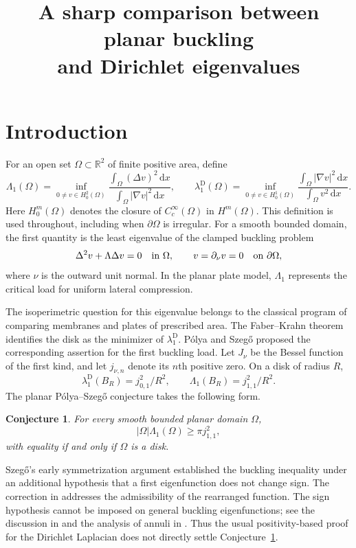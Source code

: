 \documentclass[11pt]{article}
\title{A sharp comparison between planar buckling\\and Dirichlet eigenvalues}
\author{}
\date{}
\newtheorem{conjecture}[theorem]{Conjecture}
\theoremstyle{remark}
\newcommand{\dd}{\,\mathrm d}
\begin{document}
\maketitle

\section{Introduction}
For an open set $\Omega\subset\mathbb R^2$ of finite positive area, define
\[
 \Lambda_1(\Omega)=\inf_{0\ne v\in H_0^2(\Omega)}
       \frac{\int_\Omega(\Delta v)^2\dd x}
            {\int_\Omega|\nabla v|^2\dd x},\qquad
 \lambda_1^{\mathrm D}(\Omega)=\inf_{0\ne v\in H_0^1(\Omega)}
       \frac{\int_\Omega|\nabla v|^2\dd x}
            {\int_\Omega v^2\dd x}.
\]
Here $H_0^m(\Omega)$ denotes the closure of $C_c^\infty(\Omega)$
in $H^m(\Omega)$. This definition is used throughout, including when
$\partial\Omega$ is irregular. For a smooth bounded domain, the first
quantity is the least eigenvalue of the clamped buckling problem
\[
 \Delta^2v+\Lambda\Delta v=0\quad\hbox{in }\Omega,
 \qquad v=\partial_\nu v=0\quad\hbox{on }\partial\Omega,
\]
where $\nu$ is the outward unit normal. In the planar plate model,
$\Lambda_1$ represents the critical load for uniform lateral compression.

The isoperimetric question for this eigenvalue belongs to the classical
program of comparing membranes and plates of prescribed area. The
Faber--Krahn theorem \cite{Faber,Krahn} identifies the disk as the
minimizer of $\lambda_1^{\mathrm D}$. P\'olya and Szeg\H{o}
\cite{PS} proposed the corresponding assertion for the first buckling
load. Let $J_\nu$ be the Bessel function of the first kind, and let
$j_{\nu,n}$ denote its $n$th positive zero. On a disk of radius $R$,
\[
 \lambda_1^{\mathrm D}(B_R)=j_{0,1}^2/R^2,
 \qquad \Lambda_1(B_R)=j_{1,1}^2/R^2.
\]
The planar P\'olya--Szeg\H{o} conjecture takes the following form.
\begin{conjecture}\label{conj:PS}
For every smooth bounded planar domain $\Omega$,
\[
 |\Omega|\Lambda_1(\Omega)\ge\pi j_{1,1}^2,
\]
with equality if and only if $\Omega$ is a disk.
\end{conjecture}

Szeg\H{o}'s early symmetrization argument \cite{Szego50,Szego58}
established the buckling inequality under an additional hypothesis
that a first eigenfunction does not change sign. The correction in
\cite{Szego58} addresses the admissibility of the rearranged function.
The sign hypothesis cannot be imposed on general buckling eigenfunctions;
see the discussion in \cite{AL} and the analysis of annuli in \cite{BP}.
Thus the usual positivity-based proof for the Dirichlet Laplacian does
not directly settle Conjecture~\ref{conj:PS}.
\end{document}
